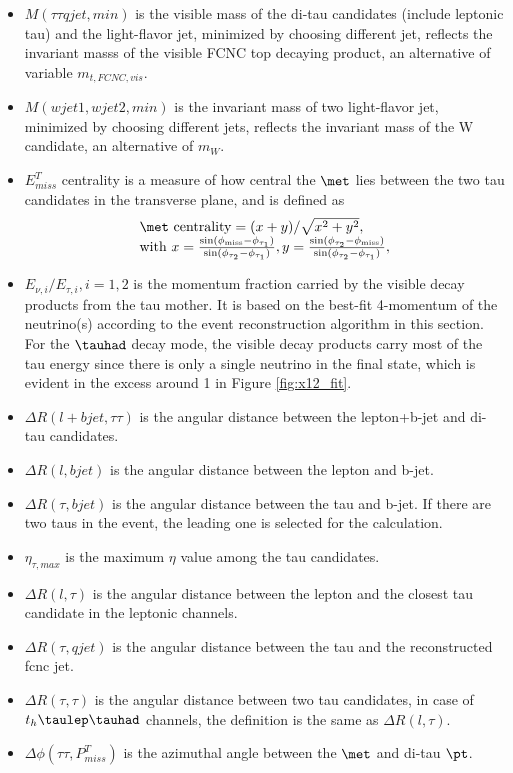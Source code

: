 \begin{itemize}
\item $M(\tau\tau qjet,min)$ is the visible mass of the di-tau candidates (include leptonic tau) and the light-flavor jet, minimized by choosing different jet, reflects the invariant masss of the visible FCNC top decaying product, an alternative of variable $m_{t,FCNC,vis}$.
\item $M(wjet1,wjet2,min)$ is the invariant mass of two light-flavor jet, minimized by choosing different jets, reflects the invariant mass of the W candidate, an alternative of $m_{W}$.
\item $E^{T}_{miss}$ centrality is a measure of how central the $\met$ lies between the two tau candidates in the transverse plane, and is defined as
\begin{eqnarray}
\begin{array}{l}
\met~\text{centrality} = {(x+y)}/{\sqrt{x^2+y^2}}, \\
\text{with}~x=\frac{\sin(\phi_{\text{miss}}-\phi_{\tau_1})}{\sin(\phi_{\tau_2}-\phi_{\tau_1})},  y=\frac{\sin(\phi_{\tau_2}-\phi_{\text{miss}})}{\sin(\phi_{\tau_2}-\phi_{\tau_1})} ,
\end{array}
\label{eq:eq3}
\end{eqnarray}
\item $E_{\nu,i}/E_{\tau,i},i=1,2$ is the momentum fraction carried by the visible decay products from the tau mother. It is based on the best-fit 4-momentum of the neutrino(s) according to the event reconstruction algorithm in this section. For the $\tauhad$ decay mode, the visible decay products carry most of the tau energy since there is only a single neutrino in the final state, which is evident in the excess around 1 in Figure \ref{fig:x12_fit}. 
\item $\Delta R(l+bjet,\tau\tau)$ is the angular distance between the lepton+b-jet and di-tau candidates.
\item $\Delta R(l,bjet)$ is the angular distance between the lepton and b-jet.
\item $\Delta R(\tau,bjet)$ is the angular distance between the tau and b-jet. If there are two taus in the event, the leading one is selected for the calculation.
\item $\eta_{\tau,max}$ is the maximum $\eta$ value among the tau candidates.
\item $\Delta R(l,\tau)$ is the angular distance between the lepton and the closest tau candidate in the leptonic channels.
\item $\Delta R(\tau,qjet)$ is the angular distance between the tau and the reconstructed fcnc jet.
\item $\Delta R(\tau,\tau)$ is the angular distance between two tau candidates, in case of $t_h\tlhad$ channels, the definition is the same as $\Delta R(l,\tau)$.
\item $\Delta\phi(\tau\tau,P^{T}_{miss})$ is the azimuthal angle between the $\met$ and di-tau $\pt$.
\end{itemize}
